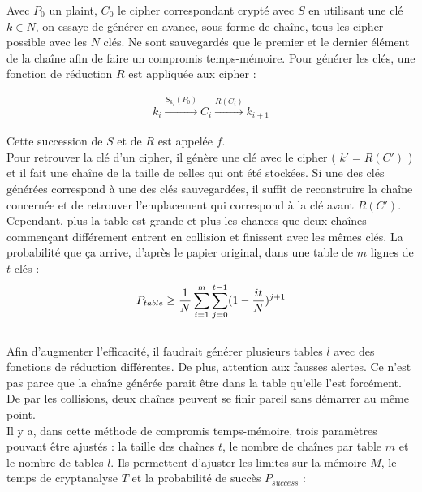 
	Avec $P_0$ un \gls{plaint}, $C_0$ le \gls{cipher} correspondant crypté avec $S$ en utilisant une clé $k \in N$, on essaye de générer en avance, sous forme de chaîne, tous les \gls{cipher} possible avec les $N$ clés. Ne sont sauvegardés que le premier et le dernier élément de la chaîne afin de faire un compromis temps-mémoire. Pour générer les clés, une fonction de réduction $R$ est appliquée aux \gls{cipher} :

	\begin{align*}
		k_i \overset{S_{k_i}(P_0)}{\longrightarrow} C_i \overset{R(C_i)}{\longrightarrow} k_{i+1}
	\end{align*}

	Cette succession de $S$ et de $R$ est appelée $f$.\\

	Pour retrouver la clé d'un \gls{cipher}, il génère une clé avec le \gls{cipher} ( $k' = R(C')$ ) et il fait une chaîne de la taille de celles qui ont été stockées. Si une des clés générées correspond à une des clés sauvegardées, il suffit de reconstruire la chaîne concernée et de retrouver l'emplacement qui correspond à la clé avant $R(C')$.\\

	Cependant, plus la table est grande et plus les chances que deux chaînes commençant différement entrent en collision et finissent avec les mêmes clés. La probabilité que ça arrive, d'après le papier original\cite{ehellman}, dans une table de $m$ lignes de $t$ clés :\\

	\begin{align*}
		P_{table} \ge{} \frac{1}{N} \sum\limits_{i=1}^{m}\sum\limits_{j=0}^{t-1} (1 - \frac{it}{N})^{j+1}
	\end{align*}\\

	Afin d'augmenter l'efficacité, il faudrait générer plusieurs tables $l$ avec des fonctions de réduction différentes. De plus, attention aux fausses alertes. Ce n'est pas parce que la chaîne générée parait être dans la table qu'elle l'est forcément. De par les collisions, deux chaînes peuvent se finir pareil sans démarrer au même point.\\

	Il y a, dans cette méthode de compromis temps-mémoire, trois paramètres pouvant être ajustés : la taille des chaînes $t$, le nombre de chaînes par table $m$ et le nombre de tables $l$. Ils permettent d'ajuster les limites sur la mémoire $M$, le temps de cryptanalyse $T$ et la probabilité de succès $P_{success}$\cite{Oech03} :

